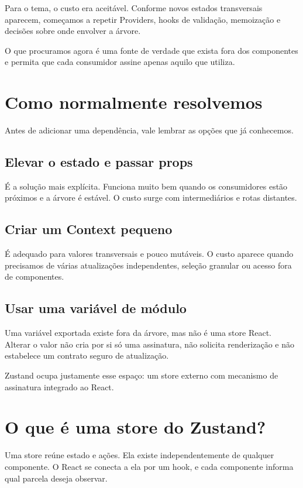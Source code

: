 Para o tema, o custo era aceitável. Conforme novos estados transversais aparecem,
começamos a repetir Providers, hooks de validação, memoização e decisões sobre
onde envolver a árvore.

O que procuramos agora é uma fonte de verdade que exista fora dos componentes e
permita que cada consumidor assine apenas aquilo que utiliza.

\section{Como normalmente resolvemos}

Antes de adicionar uma dependência, vale lembrar as opções que já conhecemos.

\subsection{Elevar o estado e passar props}

É a solução mais explícita. Funciona muito bem quando os consumidores estão
próximos e a árvore é estável. O custo surge com intermediários e rotas distantes.

\subsection{Criar um Context pequeno}

É adequado para valores transversais e pouco mutáveis. O custo aparece quando
precisamos de várias atualizações independentes, seleção granular ou acesso fora
de componentes.

\subsection{Usar uma variável de módulo}

Uma variável exportada existe fora da árvore, mas não é uma store React. Alterar
o valor não cria por si só uma assinatura, não solicita renderização e não
estabelece um contrato seguro de atualização.

Zustand ocupa justamente esse espaço: um store externo com mecanismo de
assinatura integrado ao React.

\section{O que é uma store do Zustand?}

Uma store reúne estado e ações. Ela existe independentemente de qualquer
componente. O React se conecta a ela por um hook, e cada componente informa qual
parcela deseja observar.

